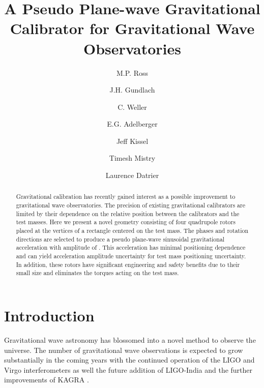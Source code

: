 \documentclass[superscriptaddress, twocolumn, prd]{revtex4-1}
\begin{document}
\title{A Pseudo Plane-wave Gravitational Calibrator for Gravitational Wave Observatories}

\author{M.P. Ross}
\author{J.H. Gundlach}
\author{C. Weller}
\author{E.G. Adelberger}
\author{Jeff Kissel}
\author{Timesh Mistry}
\author{Laurence Datrier}


\begin{abstract}

Gravitational calibration has recently gained interest as a possible improvement to gravitational wave observatories. The precision of existing gravitational calibrators are limited by their dependence on the relative position between the calibrators and the test masses. Here we present a novel geometry consisting of four quadrupole rotors placed at the vertices of a rectangle centered on the test mass. The phases and rotation directions are selected to produce a pseudo plane-wave  sinusoidal gravitational acceleration with amplitude of . This acceleration has minimal positioning dependence and can yield  acceleration amplitude uncertainty for \added{$\sim$1 cm} test mass positioning uncertainty. In addition, these rotors have significant engineering and safety benefits due to their small size and eliminates the torques acting on the test mass.

\end{abstract}

\maketitle

\section{Introduction}

Gravitational wave astronomy has blossomed into a novel method to observe the universe. The number of gravitational wave observations is expected to grow substantially in the coming years with the continued operation of the LIGO \cite{aLIGO} and Virgo \cite{virgo} interferometers as well the future addition of LIGO-India \cite{ligo-india} and the further improvements of KAGRA \cite{kagra}. 
\end{document}
